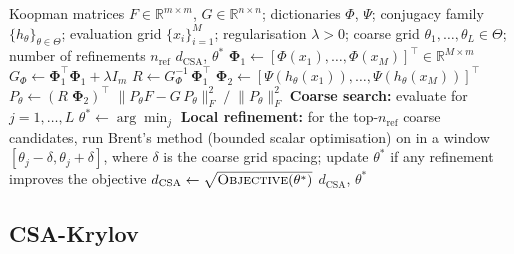 \documentclass{article}
\theoremstyle{definition}
\begin{document}
\begin{algorithm}[H]
\caption{Conjugacy-based Similarity Analysis (CSA)}
\label{alg:CSA}
\begin{algorithmic}[1]
\Require Koopman matrices $F\in\mathbb{R}^{m\times m}$,
         $G\in\mathbb{R}^{n\times n}$; dictionaries $\Phi$, $\Psi$;
         conjugacy family $\{h_\theta\}_{\theta\in\Theta}$;
         evaluation grid $\{x_i\}_{i=1}^M$;
         regularisation $\lambda>0$;
         coarse grid $\theta_1,\dots,\theta_L\in\Theta$;
         number of refinements $n_{\mathrm{ref}}$
\Ensure  $d_{\mathrm{CSA}}$, $\theta^*$
\Statex
\State $\mathbf\Phi_1 \gets [\Phi(x_1),\dots,\Phi(x_M)]^\top \in\mathbb{R}^{M\times m}$
\State $G_\Phi \gets \mathbf\Phi_1^\top \mathbf\Phi_1 + \lambda I_m$
\State $R \gets G_\Phi^{-1}\,\mathbf\Phi_1^\top$
\Statex
{}
    \State $\mathbf\Phi_2 \gets [\Psi(h_\theta(x_1)),\dots,\Psi(h_\theta(x_M))]^\top$
    \State $P_\theta \gets (R\;\mathbf\Phi_2)^\top$
    \State \Return $\|P_\theta F - G\,P_\theta\|_F^2 \;/\; \|P_\theta\|_F^2$
\EndFunction
\Statex
\State \textbf{Coarse search:} evaluate  for $j=1,\dots,L$
\State $\theta^* \gets \arg\min_j$ 
\Statex
\State \textbf{Local refinement:} for the top-$n_{\mathrm{ref}}$ coarse candidates, run Brent's method (bounded scalar optimisation) on  in a window $[\theta_j - \delta, \theta_j + \delta]$, where $\delta$ is the coarse grid spacing; update $\theta^*$ if any refinement improves the objective
\Statex
\State $d_{\mathrm{CSA}} \gets \sqrt{\textsc{Objective}(\theta^*)}$
\State \Return $d_{\mathrm{CSA}}$, $\theta^*$
\end{algorithmic}
\end{algorithm}


\subsection{CSA-Krylov}
\end{document}
